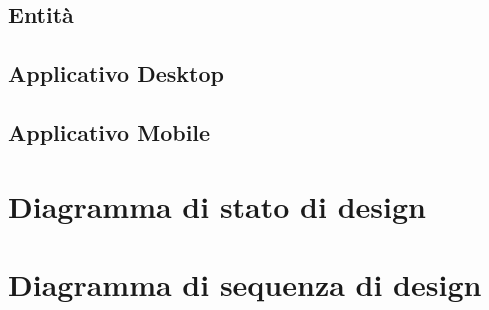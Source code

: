 \subsection{Entità}
    
     
    
    
    
\subsection{Applicativo Desktop} 
    
    
    
    
    
    
    
    
    
    
    
    
    \pagebreak
\subsection{Applicativo Mobile}
    
    
    
    
    
    
    
    
    
    
    
    
    
    
    
    
    
    
\section{Diagramma di stato di design}

\section{Diagramma di sequenza di design}
